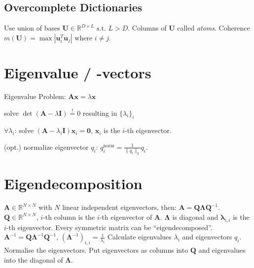 \documentclass[a4paper, 11pt, landscape]{article}
\begin{document}
\begin{multicols*}{3}
\subsection{Overcomplete Dictionaries}
Use union of bases $\mathbf{U} \in \mathbb{R}^{D\times L} \text{ s.t. } L > D$. Columns of $\mathbf{U}$ called \emph{atoms}.
Coherence $m(\mathbf{U}) = \max |\mathbf{u}^T_i \mathbf{u}_j|\text{ where } i\neq j$.

\section{Eigenvalue / -vectors}
Eigenvalue Problem: $\mathbf{Ax} = \lambda \mathbf{x}$
\begin{compactenum}
	\item solve $\operatorname{det}(\mathbf{A} - \lambda \mathbf{I}) \overset{!}{=} 0$ resulting in $\{\lambda_i\}_i$
	\item $\forall \lambda_i$:
		solve $(\mathbf{A} - \lambda_i \mathbf{I}) \mathbf{x}_i = \mathbf{0}$, $\mathbf{x}_i$ is the $i$-th eigenvector.
	\item (opt.) normalize eigenvector $q_i$: $q_i^{\text{norm}} = \frac{1}{\|q_i\|_2} q_i$.
\end{compactenum}

\section{Eigendecomposition}
$\mathbf{A} \in \mathbb{R}^{N \times N}$ with $N$ linear independent eigenvectors, then: $\mathbf{A} = \mathbf{Q} \boldsymbol{\Lambda} \mathbf{Q}^{-1}$. $\mathbf{Q} \in \mathbb{R}^{N \times N}$, $i$-th column is the $i$-th eigenvector of $\mathbf{A}$. $\boldsymbol{\Lambda}$ is diagonal and $\boldsymbol{\lambda}_{i,i}$ is the $i$-th eigenvector. Every symmetric matrix can be ``eigendecomposed''. 
$\mathbf{A}^{-1} = \mathbf{Q} \boldsymbol{\Lambda}^{-1} \mathbf{Q}^{-1}$, $(\boldsymbol{\Lambda}^{-1})_{i,i} = \frac{1}{\lambda_i}$
Calculate eigenvalues $\lambda_i$ and eigenvectors $q_i$. Normalise the eigenvectors. Put eigenvectors as columns into $\mathbf{Q}$ and eigenvalues into the diagonal of $\boldsymbol{\Lambda}$.


\end{multicols*}
\end{document}
